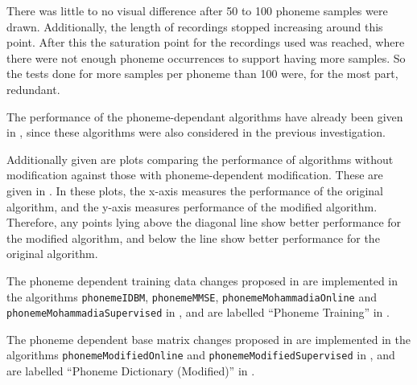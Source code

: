 There was little to no visual difference after 50 to 100 phoneme samples
were drawn. Additionally, the length of recordings stopped increasing
around this point. After this the saturation point for the recordings
used was reached, where there were not enough phoneme occurrences
to support having more samples. So the tests done for more samples
per phoneme than 100 were, for the most part, redundant.

The performance of the phoneme-dependant algorithms have already been
given in ,
since these algorithms were also considered in the previous investigation.

Additionally given are plots comparing the performance of algorithms
without modification against those with phoneme-dependent modification.
These are given in .
In these plots, the x-axis measures the performance of the original
algorithm, and the y-axis measures performance of the modified algorithm.
Therefore, any points lying above the diagonal line show better performance
for the modified algorithm, and below the line show better performance
for the original algorithm.

The phoneme dependent training data changes proposed in 
are implemented in the algorithms \lstinline[breaklines=true]!phonemeIDBM!,
\lstinline[breaklines=true]!phonemeMMSE!, \lstinline[breaklines=true]!phonemeMohammadiaOnline!
and\linebreak{}
\lstinline[breaklines=true]!phonemeMohammadiaSupervised! in ,
and are labelled ``Phoneme Training'' in .

The phoneme dependent base matrix changes proposed in 
are implemented in the algorithms \lstinline[breaklines=true]!phonemeModifiedOnline!
and \lstinline[breaklines=true]!phonemeModifiedSupervised! in ,
and are labelled ``Phoneme Dictionary (Modified)'' in .

